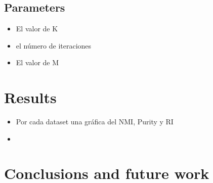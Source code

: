 \documentclass[runningheads]{llncs}
\begin{document}
\subsection{Parameters}



\begin{itemize}
\item El valor de K
\item el número de iteraciones
\item El valor de M
\end{itemize}

\section{Results}

\begin{itemize}
\item Por cada dataset una gráfica del NMI, Purity y RI
\item 
\end{itemize}
\section{Conclusions and future work}

%
%
%


%
\end{document}
